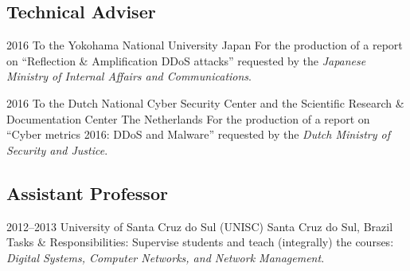 \documentclass[print]{styles/friggeri-cv-mac} %
\begin{document}
\subsection{Technical Adviser}\vspace{-5pt}
\begin{entrylist}
\entry
{2016}
{To the Yokohama National University}
{Japan}
{For the production of a report on ``Reflection \& Amplification DDoS attacks'' requested by the \emph{Japanese Ministry of Internal Affairs and Communications}.}

\entry
{2016}
{To the Dutch National Cyber Security Center and the Scientific Research \& Documentation Center}
{The Netherlands}
{For the production of a report on ``Cyber metrics 2016: DDoS and Malware'' requested by the \emph{Dutch Ministry of Security and Justice}.}
\end{entrylist}

\subsection{Assistant Professor}\vspace{-5pt}
\begin{entrylist}
\entry
{2012--2013}
{University of Santa Cruz do Sul (UNISC)}
{Santa Cruz do Sul, Brazil}
{Tasks \& Responsibilities: Supervise students and teach (integrally) the courses: \textit{Digital
Systems, Computer Networks, and Network Management}.} 
\end{entrylist}
\end{document}
